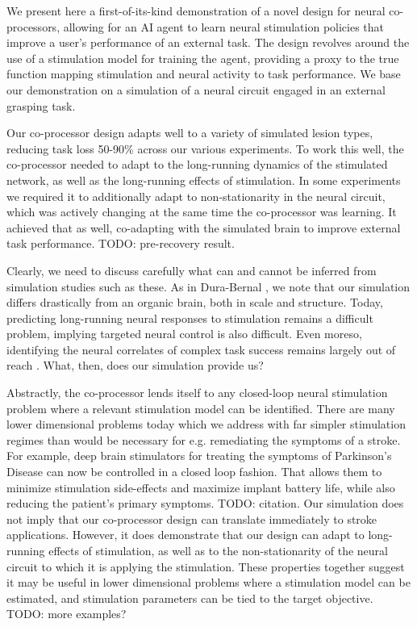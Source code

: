 \documentclass[12pt]{iopart}
\begin{document}
We present here a first-of-its-kind demonstration of a novel design for neural co-processors,
allowing for an AI agent to learn neural stimulation policies that improve a user's performance
of an external task. The design revolves around the use of a stimulation model for training the
agent, providing a proxy to the true function mapping stimulation and neural activity
to task performance. We base our demonstration on a simulation of a neural circuit engaged in
an external grasping task.

Our co-processor design adapts well to a variety of simulated lesion types, reducing task loss
50-90\% across our various experiments. To work this well, the co-processor needed to adapt to
the long-running dynamics of the stimulated network, as well as the long-running effects of
stimulation. In some experiments we required it to additionally adapt to non-stationarity in
the neural circuit, which was actively changing at the same time the co-processor was learning.
It achieved that as well, co-adapting with the simulated brain to improve external task
performance.  TODO: pre-recovery result.

Clearly, we need to discuss carefully what can and cannot be inferred from simulation studies
such as these. As in Dura-Bernal \cite{bernal.sim}, we note that our simulation differs
drastically from an organic brain, both in scale and structure. Today, predicting long-running
neural responses to stimulation remains a difficult problem, implying targeted neural control
is also difficult. Even moreso, identifying the neural correlates of complex task success
remains largely out of reach \cite{khanna.openloop}. What, then, does our simulation provide us?

Abstractly, the co-processor lends itself to any closed-loop neural stimulation problem
where a relevant stimulation model can be identified. There are many lower dimensional problems
today which we address with far simpler stimulation regimes than would be necessary for
e.g. remediating the symptoms of a stroke. For example, deep brain stimulators for
treating the symptoms of Parkinson's Disease can now be controlled in a closed loop
fashion. That allows them to minimize stimulation side-effects and maximize implant
battery life, while also reducing the patient's primary symptoms. TODO: citation. Our
simulation does not imply that our co-processor design can translate immediately to
stroke applications. However, it does demonstrate that our design can adapt to
long-running effects of stimulation, as well as to the non-stationarity of the neural
circuit to which it is applying the stimulation. These properties together suggest it may be
useful in lower dimensional problems where a stimulation model can be estimated, and
stimulation parameters can be tied to the target objective. TODO: more examples?
\end{document}
